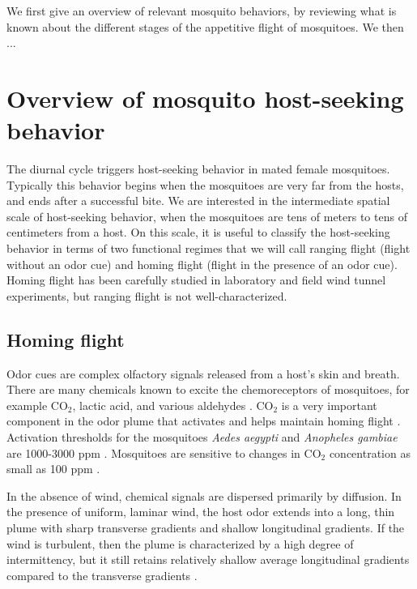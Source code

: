 \documentclass[12pt]{article}
\begin{document}
We first give an overview of relevant mosquito behaviors, by reviewing what is known about the different stages of the appetitive flight of mosquitoes. 
We then ...

\section{Overview of mosquito host-seeking behavior}\label{sec:mosqbehav}

The diurnal cycle triggers host-seeking behavior in mated female mosquitoes. Typically this behavior begins when the mosquitoes are very far from the hosts, and ends after a successful bite. We are interested in the intermediate spatial scale of host-seeking behavior, when the mosquitoes are tens of meters to tens of centimeters from a host. On this scale, it is useful to classify the host-seeking behavior in terms of two functional regimes that we will call ranging flight (flight without an odor cue) and homing flight (flight in the presence of an odor cue). Homing flight has been carefully studied in laboratory and field wind tunnel experiments, but ranging flight is not well-characterized.

\subsection{Homing flight}

Odor cues are complex olfactory signals released from a host's skin and breath. There are many chemicals known to excite the chemoreceptors of mosquitoes, for example CO$_2$, lactic acid, and various aldehydes \cite{Bowen1991,Syed2009}. CO$_2$ is a very important component in the odor plume that activates and helps maintain homing flight \cite{Bowen1991,Gibson1999,Gillies1980}. Activation thresholds for the mosquitoes \emph{Aedes aegypti} and \emph{Anopheles gambiae} are 1000-3000 ppm \cite{Gibson1999}. Mosquitoes are sensitive to changes in CO$_2$ concentration as small as 100 ppm \cite{Gillies1980}.

In the absence of wind, chemical signals are dispersed primarily by diffusion. In the presence of uniform, laminar wind, the host odor extends into a long, thin plume with sharp transverse gradients and shallow longitudinal gradients. If the wind is turbulent, then the plume is characterized by a high degree of intermittency, but it still retains relatively shallow average longitudinal gradients compared to the transverse gradients \cite{Vickers2000}. 
\end{document}
